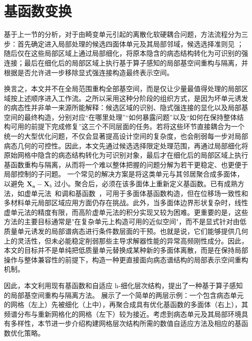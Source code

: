 \section{基函数变换}

基于上一节的分析，对于由畸变单元引起的离散化软硬耦合问题，方法流程分为三步：首先确定进入局部处理的候选四面体单元及其局部邻域，候选选择准则见 ；随后仅在这些局部区域上通过局部细化，将原本隐含的病态结构转化为可识别的强连接；最后在细化后的局部区域上执行基于算子感知的局部基空间重构与隔离，并根据是否允许进一步移除显式强连接构造最终表示空间。

换言之，本文并不在全局范围重构全部基空间，而是仅让少量最值得处理的局部区域按上述顺序进入工作流。之所以采用这种分阶段的组织方式，是因为坏单元诱发的病态性并非单一来源所能解释：候选区域的识别、隐式强连接的显化以及局部基空间的最终构造，分别对应“在哪里处理”“如何暴露问题”以及“如何在保持整体结构可用的前提下完成修复”这三个不同层面的任务。若将这些环节直接耦合为一个统一的大型优化问题，不仅会显著提高设计空间的复杂度，也会削弱每一步对局部病态几何的可控性。因此，本文先通过候选选择限定处理范围，再通过局部细化将原始网格中隐含的病态结构转化为可识别对象，最后才在细化后的局部区域上执行基函数重构与隔离，从而将一个难以整体把握的问题分解为若干更稳定、也更便于局部控制的子问题。
一个常见的解决方案是将这类单元与其邻居聚合成多面体，以避免 $\mathbf{X_a}- \mathbf{X}_b$ 过小。聚合后，必须在该多面体上重新定义基函数。已有成熟方法，如虚单元法~\cite{MENGOLINI2019995}和调和基函数~\cite{Dasgupta2003}，可用于多面体基函数构造，但在位移场一致性和多材料单元局部区域应用方面仍存在挑战。此外，当多面体边界形状复杂时，线性虚单元法的精度有限，而高阶虚单元法的积分实现又较为困难。更重要的是，这些方法的主要目标通常是"在复杂单元上构造可用的近似空间"，而不是显式针对由低质量单元诱发的局部谱病态进行条件数层面的干预。也就是说，它们能够提供几何上的灵活性，但未必能稳定削弱那些主导求解器性能的异常高频刚性成分。因此，本文的目标并不是单纯把低质量单元替换成某种新的多面体离散，而是在保持局部操作与整体兼容性的前提下，构造一种更直接面向病态谱结构的局部表示空间重构机制。

因此，本文利用现有基函数和自适应 h-细化层次结构，提出了一种基于算子感知的局部基空间重构与隔离方法。 展示了一个简单的两层示例：一个包含病态单元的网格（左上）先被细化（上中），再聚合成具有优化基函数的多面体（右上），其频谱分布与重新网格化的网格（左下）较为接近。考虑到病态单元及其局部环境具有多样性，本节进一步介绍构建网格层次结构所需的数值自适应方法及相应的基函数优化策略。

